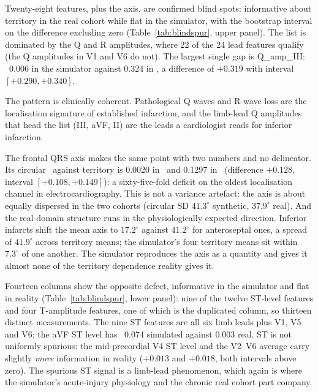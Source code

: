 Twenty-eight features, plus the axis, are confirmed blind spots: informative about territory in the real cohort while flat in the simulator, with the bootstrap interval on the difference excluding zero (Table~\ref{tab:blindspur}, upper panel). The list is dominated by the Q and R amplitudes, where 22 of the 24 lead features qualify (the Q amplitudes in V1 and V6 do not). The largest single gap is Q\_amp\_III: \etasq\ 0.006 in the simulator against 0.324 in \ptbxl, a difference of $+0.319$ with interval $[+0.290, +0.340]$. 

The pattern is clinically coherent. Pathological Q waves and R-wave loss are the localisation signature of established infarction, and the limb-lead Q amplitudes that head the list (III, aVF, II) are the leads a cardiologist reads for inferior infarction. 

The frontal QRS axis makes the same point with two numbers and no delineator. Its circular \etasq\ against territory is 0.0020 in \medalcare\ and 0.1297 in \ptbxl\ (difference $+0.128$, interval $[+0.108, +0.149]$): a sixty-five-fold deficit on the oldest localisation channel in electrocardiography. This is not a variance artefact: the axis is about equally dispersed in the two cohorts (circular SD $41.3^\circ$ synthetic, $37.9^\circ$ real). And the real-domain structure runs in the physiologically expected direction. Inferior infarcts shift the mean axis to $17.2^\circ$ against $41.2^\circ$ for anteroseptal ones, a spread of $41.9^\circ$ across territory means; the simulator's four territory means sit within $7.3^\circ$ of one another. The simulator reproduces the axis as a quantity and gives it almost none of the territory dependence reality gives it. 

Fourteen columns show the opposite defect, informative in the simulator and flat in reality (Table~\ref{tab:blindspur}, lower panel): nine of the twelve ST-level features and four T-amplitude features, one of which is the duplicated column, so thirteen distinct measurements. The nine ST features are all six limb leads plus V1, V5 and V6; the aVF ST level has \etasq\ 0.074 simulated against 0.003 real. ST is not uniformly spurious: the mid-precordial V4 ST level and the V2--V6 average carry slightly \emph{more} information in reality ($+0.013$ and $+0.018$, both intervals above zero). The spurious ST signal is a limb-lead phenomenon, which again is where the simulator's acute-injury physiology and the chronic real cohort part company. 

